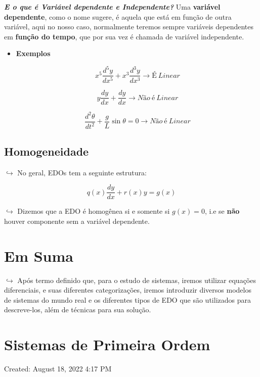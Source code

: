 \documentclass{article}
\begin{document}
\begin{itemize}
\textbf{\emph{E o que é Variável dependente e Independente?}} Uma
\textbf{variável dependente}, como o nome sugere, é aquela que está em
função de outra variável, aqui no nosso caso, normalmente teremos sempre
variáveis dependentes em \textbf{função do tempo}, que por sua vez é
chamada de variável independente.

\begin{itemize}
\item
  \textbf{Exemplos}

  \[
    x^5 \frac{d^5 y}{dx^5} + x^3 \frac{d^3 y}{dx^3}  \rightarrow É \ Linear
    \]

  \[
    \boxed{y\frac{dy}{dx}} + \frac{dy}{dx} \rightarrow Não \ é \ Linear
    \]

  \[
    \frac{d^2 \theta}{dt^2} + \frac{g}{L} \boxed{\sin \theta} = 0 \rightarrow Não \ é \ Linear
    \]
\end{itemize}

\hypertarget{homogeneidade}{%
\subsection{Homogeneidade}\label{homogeneidade}}

\(\hookrightarrow\) No geral, EDOs tem a seguinte estrutura:

$$
q(x)\frac{dy}{dx} + r(x)y = g(x)
$$

\(\hookrightarrow\) Dizemos que a EDO é homogênea si e somente si
\(g(x) = 0\), i.e se \textbf{não} houver componente sem a variável
dependente.

\hypertarget{em-suma}{%
\section{Em Suma}\label{em-suma}}

\(\hookrightarrow\) Após termo definido que, para o estudo de sistemas,
iremos utilizar equações diferenciais, e suas diferentes categorizações,
iremos introduzir diversos modelos de sistemas do mundo real e os
diferentes tipos de EDO que são utilizados para descreve-los, além de
técnicas para sua solução.

\hypertarget{sistemas-de-primeira-ordem}{%
\section{Sistemas de Primeira Ordem}\label{sistemas-de-primeira-ordem}}

Created: August 18, 2022 4:17 PM


\end{itemize}
\end{document}

